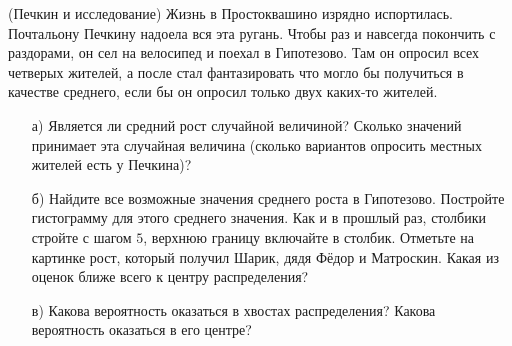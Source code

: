 \documentclass[12pt, a4paper, oneside]{article}
\begin{document}
\begin{problem}{(Печкин и исследование)}
Жизнь в Простоквашино изрядно испортилась. Почтальону Печкину надоела вся эта ругань. Чтобы раз и навсегда покончить с раздорами, он сел на велосипед и поехал в Гипотезово. Там он опросил всех четверых жителей, а после стал фантазировать что могло бы получиться в качестве среднего, если бы он опросил только двух каких-то жителей. 

\begin{enumerate} 
	\item[а)] Является ли средний рост случайной величиной? Сколько значений принимает эта случайная величина (сколько вариантов опросить местных жителей есть у Печкина)?
	\item[б)] Найдите все возможные значения среднего роста в Гипотезово. Постройте гистограмму для этого среднего значения. Как и в прошлый раз, столбики стройте с шагом $5$, верхнюю границу включайте в столбик. Отметьте на картинке рост, который получил Шарик, дядя Фёдор и Матроскин. Какая из оценок ближе всего к центру распределения? 
	\item[в)] Какова вероятность оказаться в хвостах распределения? Какова вероятность оказаться в его центре? 
\end{enumerate} 
\end{problem}
\end{document}
